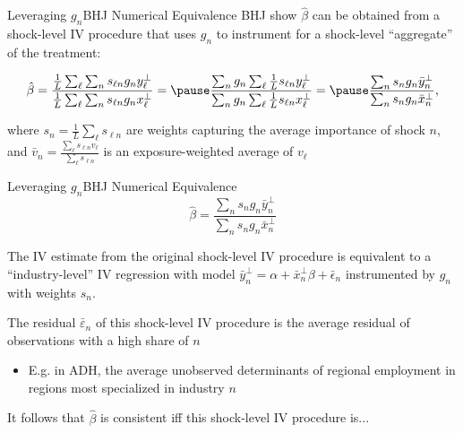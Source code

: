 \documentclass[t]{beamer}
\begin{document}
\begin{frame}{Leveraging $g_n$}{BHJ Numerical Equivalence}
\vspace{-0.2cm}
 BHJ show $\hat{\beta}$ can be obtained from a %
shock-level IV procedure that uses $g_n$ to instrument for a shock-level ``aggregate'' of the treatment:\pause

\begin{align*}
\hat{\beta}=\frac{\frac{1}{L}\sum_\ell \sum_n s_{\ell n} g_n y_\ell^\perp}{\frac{1}{L}\sum_\ell \sum_n s_{\ell n} g_n x_\ell^\perp}=\pause\frac{\sum_n g_n \sum_\ell\frac{1}{L}  s_{\ell n} y_\ell^\perp}{\sum_n g_n\sum_\ell\frac{1}{L}  s_{\ell n}  x_\ell^\perp}=\pause\frac{\sum_n s_n g_n \bar{y}_n^\perp}{\sum_n s_n g_n \bar{x}_n^\perp},
\end{align*}

\vspace{2.5mm}
where $s_n=\frac{1}{L}\sum_\ell s_{\ell n}$ are weights capturing the average importance of shock $n$, and $\bar{v}_n=\frac{\sum_\ell s_{\ell n} v_\ell}{\sum_\ell s_{\ell n}}$ is an exposure-weighted average of $v_\ell$
\end{frame}


\begin{frame}{Leveraging $g_n$}{BHJ Numerical Equivalence}
\vspace{-7.5mm}
$$
\hat{\beta}= \frac{\sum_n s_n g_n \bar{y}_n^\perp}{\sum_n s_n g_n \bar{x}_n^\perp}
$$

\vspace{2.5mm}
The IV estimate from the original shock-level IV procedure is equivalent to a ``industry-level'' IV regression with model $\bar{y}_n^\perp = \alpha + \bar{x}_n^\perp \beta + \bar{\epsilon}_n$ instrumented by $g_n$ with weights $s_n$.
\medskip

The residual $\bar\varepsilon_n$ of this shock-level IV procedure is the average residual of observations with a high share of $n$
\begin{itemize}
  \item E.g. in ADH, the average unobserved determinants of regional employment in regions most specialized in industry $n$
\end{itemize}

\pause
It follows that $\hat{\beta}$ is consistent iff this shock-level IV procedure is...

\end{frame}
\end{document}
